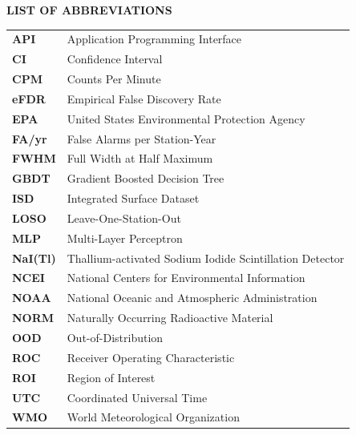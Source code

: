 \documentclass[11pt,a4paper]{article}
\begin{document}
\begin{framed}
\noindent\textbf{LIST OF ABBREVIATIONS}\\[0.6em]
\begin{tabular}{l l}
\textbf{API} & Application Programming Interface \\
\textbf{CI} & Confidence Interval \\
\textbf{CPM} & Counts Per Minute \\
\textbf{eFDR} & Empirical False Discovery Rate \\
\textbf{EPA} & United States Environmental Protection Agency \\
\textbf{FA/yr} & False Alarms per Station-Year \\
\textbf{FWHM} & Full Width at Half Maximum \\
\textbf{GBDT} & Gradient Boosted Decision Tree \\
\textbf{ISD} & Integrated Surface Dataset \\
\textbf{LOSO} & Leave-One-Station-Out \\
\textbf{MLP} & Multi-Layer Perceptron \\
\textbf{NaI(Tl)} & Thallium-activated Sodium Iodide Scintillation Detector \\
\textbf{NCEI} & National Centers for Environmental Information \\
\textbf{NOAA} & National Oceanic and Atmospheric Administration \\
\textbf{NORM} & Naturally Occurring Radioactive Material \\
\textbf{OOD} & Out-of-Distribution \\
\textbf{ROC} & Receiver Operating Characteristic \\
\textbf{ROI} & Region of Interest \\
\textbf{UTC} & Coordinated Universal Time \\
\textbf{WMO} & World Meteorological Organization \\
\end{tabular}
\end{framed}

\newpage
\end{document}
